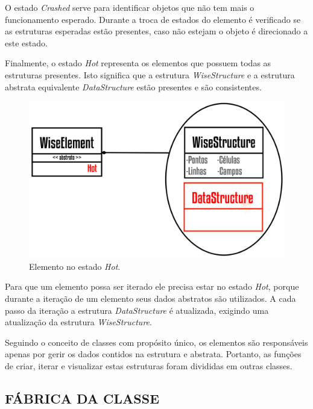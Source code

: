 O estado \textit{Crashed} serve para identificar objetos que não tem mais o funcionamento esperado. Durante a troca de estados do elemento é verificado se as estruturas esperadas estão presentes, caso não estejam o objeto é direcionado a este estado.

Finalmente, o estado \textit{Hot} representa os elementos que possuem todas as estruturas presentes. Isto significa que a estrutura \textit{WiseStructure} e a estrutura abstrata equivalente \textit{DataStructure} estão presentes e são consistentes.

\begin{figure}[!htbp]
	\centering
	\includegraphics[scale=1.85]{Figures/WiseElementHot@16x.png}
	\caption{Elemento no estado \textit{Hot}.}
	\label{fig6:wiseelementhot}
\end{figure}

Para que um elemento possa ser iterado ele precisa estar no estado \textit{Hot}, porque durante a iteração de um elemento seus dados abstratos são utilizados. A cada passo da iteração a estrutura \textit{DataStructure} é atualizada, exigindo uma atualização da estrutura \textit{WiseStructure}.

Seguindo o conceito de classes com propósito único, os elementos são responsáveis apenas por gerir os dados contidos na estrutura e abstrata. Portanto, as funções de criar, iterar e visualizar estas estruturas foram divididas em outras classes.

\subsection{FÁBRICA DA CLASSE}\label{sec:fabrica} 

